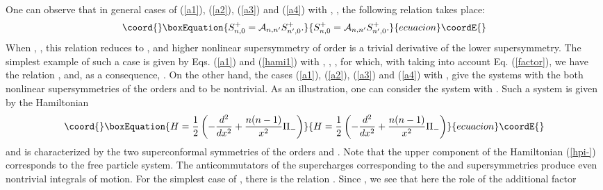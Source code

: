 \documentclass[a4paper,12pt]{article}
\begin{document}
One can observe that
in general cases of (\ref{a1}),
(\ref{a2}), (\ref{a3}) and (\ref{a4})
with \coordHE{}, \coordHE{},
the following relation takes place:
\begin{equation}\coord{}\boxEquation{
S^+_{n,0}={\cal A}_{n,n'}S^+_{n',0}.
\label{cala}
}{
S^+_{n,0}={\cal A}_{n,n'}S^+_{n',0}.
}{ecuacion}\coordE{}\end{equation}
When \coordHE{}, \coordHE{},
this relation reduces to
\coordHE{},
and higher nonlinear supersymmetry of order \coordHE{}
is a trivial derivative of the lower supersymmetry.
The simplest example of such a case is given
by Eqs. (\ref{a1}) and (\ref{hami1})
with \coordHE{}, \coordHE{}, \coordHE{},
for which, with taking into account Eq.
(\ref{factor}), we have the relation
\coordHE{},
and, as a consequence,
\coordHE{}.
On the other hand,
the cases (\ref{a1}),
(\ref{a2}), (\ref{a3}) and (\ref{a4})
with \coordHE{}, \coordHE{}
give the systems with the both nonlinear supersymmetries
of the orders \coordHE{} and \coordHE{} to be nontrivial.
As an illustration, one can consider the
system with \coordHE{}.
Such a system is given by the Hamiltonian
\begin{equation}\coord{}\boxEquation{
H=\frac{1}{2}\left(-\frac{d^2}{dx^2}+\frac{n(n-1)}{x^2}\Pi_-
\right)
\label{hpi-}
}{
H=\frac{1}{2}\left(-\frac{d^2}{dx^2}+\frac{n(n-1)}{x^2}\Pi_-
\right)
}{ecuacion}\coordE{}\end{equation}
and is characterized by the two superconformal
symmetries of the orders \coordHE{} and \coordHE{}.
Note that the upper component \coordHE{} of the Hamiltonian
(\ref{hpi-}) corresponds to the free particle system.
The anticommutators of the supercharges
corresponding to the
\coordHE{} and \coordHE{} supersymmetries
produce even nontrivial integrals of motion.
For the simplest case of \coordHE{},
there is the relation
\coordHE{}.
Since \coordHE{},
we see that here the role of the additional factor
\end{document}
